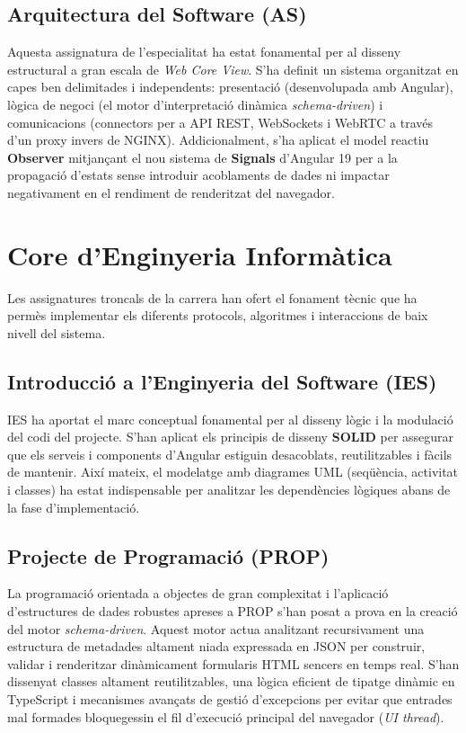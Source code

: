 \subsection{Arquitectura del Software (AS)}
Aquesta assignatura de l'especialitat ha estat fonamental per al disseny estructural a gran escala de \textit{Web Core View}. S'ha definit un sistema organitzat en capes ben delimitades i independents: presentació (desenvolupada amb Angular), lògica de negoci (el motor d'interpretació dinàmica \textit{schema-driven}) i comunicacions (connectors per a API REST, WebSockets i WebRTC a través d'un proxy invers de NGINX). Addicionalment, s'ha aplicat el model reactiu \textbf{Observer} mitjançant el nou sistema de \textbf{Signals} d'Angular 19 per a la propagació d'estats sense introduir acoblaments de dades ni impactar negativament en el rendiment de renderitzat del navegador.

\section{Core d'Enginyeria Informàtica}
Les assignatures troncals de la carrera han ofert el fonament tècnic que ha permès implementar els diferents protocols, algoritmes i interaccions de baix nivell del sistema.

\subsection{Introducció a l'Enginyeria del Software (IES)}
IES ha aportat el marc conceptual fonamental per al disseny lògic i la modulació del codi del projecte. S'han aplicat els principis de disseny \textbf{SOLID} \cite{solid_principles} per assegurar que els serveis i components d'Angular estiguin desacoblats, reutilitzables i fàcils de mantenir. Així mateix, el modelatge amb diagrames UML (seqüència, activitat i classes) ha estat indispensable per analitzar les dependències lògiques abans de la fase d'implementació.

\subsection{Projecte de Programació (PROP)}
La programació orientada a objectes de gran complexitat i l'aplicació d'estructures de dades robustes apreses a PROP s'han posat a prova en la creació del motor \textit{schema-driven}. Aquest motor actua analitzant recursivament una estructura de metadades altament niada expressada en JSON per construir, validar i renderitzar dinàmicament formularis HTML sencers en temps real. S'han dissenyat classes altament reutilitzables, una lògica eficient de tipatge dinàmic en TypeScript i mecanismes avançats de gestió d'excepcions per evitar que entrades mal formades bloquegessin el fil d'execució principal del navegador (\textit{UI thread}).

